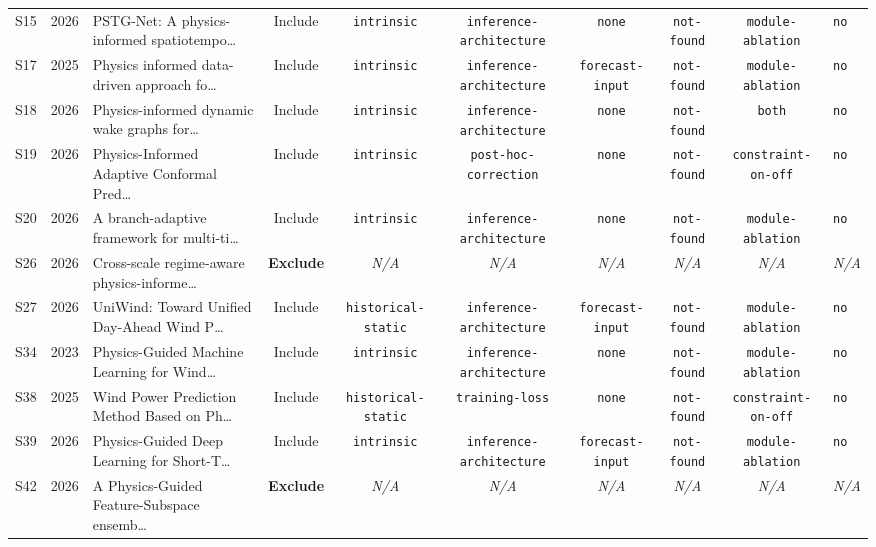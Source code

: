 \begin{table}[!t]
\begin{tabularx}{\textwidth}{llp{4.2cm}cccccc}
S15 & 2026 & PSTG-Net: A physics-informed spatiotempo\dots & Include & \texttt{intrinsic} & \texttt{inference-architecture} & \texttt{none} & \texttt{not-found} & \texttt{module-ablation} & \texttt{no} \\
S17 & 2025 & Physics informed data-driven approach fo\dots & Include & \texttt{intrinsic} & \texttt{inference-architecture} & \texttt{forecast-input} & \texttt{not-found} & \texttt{module-ablation} & \texttt{no} \\
S18 & 2026 & Physics-informed dynamic wake graphs for\dots & Include & \texttt{intrinsic} & \texttt{inference-architecture} & \texttt{none} & \texttt{not-found} & \texttt{both} & \texttt{no} \\
S19 & 2026 & Physics-Informed Adaptive Conformal Pred\dots & Include & \texttt{intrinsic} & \texttt{post-hoc-correction} & \texttt{none} & \texttt{not-found} & \texttt{constraint-on-off} & \texttt{no} \\
S20 & 2026 & A branch-adaptive framework for multi-ti\dots & Include & \texttt{intrinsic} & \texttt{inference-architecture} & \texttt{none} & \texttt{not-found} & \texttt{module-ablation} & \texttt{no} \\
S26 & 2026 & Cross-scale regime-aware physics-informe\dots & \textbf{Exclude} & \textit{N/A} & \textit{N/A} & \textit{N/A} & \textit{N/A} & \textit{N/A} & \textit{N/A} \\
S27 & 2026 & UniWind: Toward Unified Day-Ahead Wind P\dots & Include & \texttt{historical-static} & \texttt{inference-architecture} & \texttt{forecast-input} & \texttt{not-found} & \texttt{module-ablation} & \texttt{no} \\
S34 & 2023 & Physics-Guided Machine Learning for Wind\dots & Include & \texttt{intrinsic} & \texttt{inference-architecture} & \texttt{none} & \texttt{not-found} & \texttt{module-ablation} & \texttt{no} \\
S38 & 2025 & Wind Power Prediction Method Based on Ph\dots & Include & \texttt{historical-static} & \texttt{training-loss} & \texttt{none} & \texttt{not-found} & \texttt{constraint-on-off} & \texttt{no} \\
S39 & 2026 & Physics-Guided Deep Learning for Short-T\dots & Include & \texttt{intrinsic} & \texttt{inference-architecture} & \texttt{forecast-input} & \texttt{not-found} & \texttt{module-ablation} & \texttt{no} \\
S42 & 2026 & A Physics-Guided Feature-Subspace ensemb\dots & \textbf{Exclude} & \textit{N/A} & \textit{N/A} & \textit{N/A} & \textit{N/A} & \textit{N/A} & \textit{N/A} \\

\end{tabularx}
\end{table}
